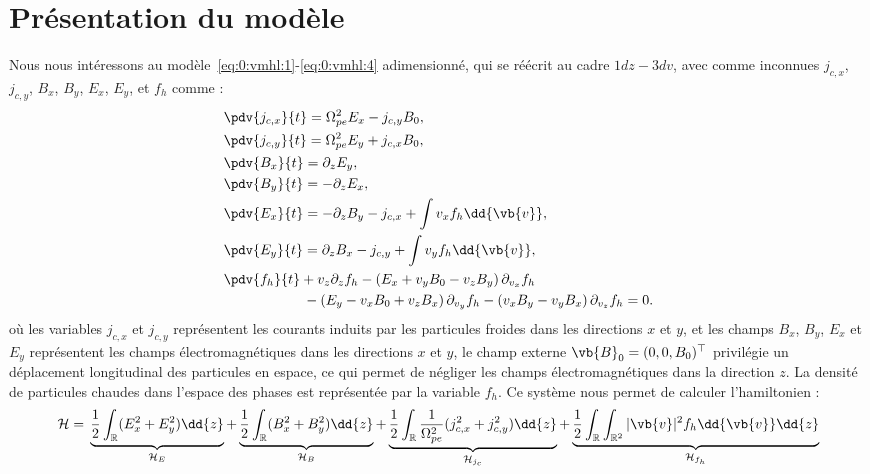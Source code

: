 
\section{Présentation du modèle}
\label{s:3:model}

Nous nous intéressons au modèle~\eqref{eq:0:vmhl:1}-\eqref{eq:0:vmhl:4} adimensionné, qui se réécrit au cadre $1dz-3dv$, avec comme inconnues $j_{c,x}$, $j_{c,y}$, $B_{x}$, $B_{y}$, $E_{x}$, $E_{y}$, et $f_h$ comme :
\begin{align}
  \label{eq:VHM:jx}
  &\pdv{j_{c,x}}{t} = \Omega_{pe}^2 { E}_x - { j}_{c,y}B_0,\\
  \label{eq:VHM:jy}
  &\pdv{j_{c,y}}{t} = \Omega_{pe}^2 { E}_y + { j}_{c,x}B_0,\\
  \label{eq:VHM:Bx}
  &\pdv{B_{x  }}{t} = \partial_z E_y,\\
  \label{eq:VHM:By}
  &\pdv{B_{y  }}{t} = -\partial_z E_x,\\
  \label{eq:VHM:Ex}
  &\pdv{E_{x  }}{t} =-\partial_z B_y - {j}_{c,x} + \int v_x f_h \dd{\vb{v}},\\
  \label{eq:VHM:Ey}
  &\pdv{E_{y  }}{t} =\partial_z B_x - {j}_{c,y} + \int v_y f_h \dd{\vb{v}}, \\
  \label{eq:VHM:fh}
  &\pdv{f_{h  }}{t} +  v_z\partial_z f_h - \left(E_x + v_y B_0 - v_zB_y\right)\partial_{v_x} f_h\\
  &\hspace{2cm}- \left(E_y - v_x B_0 + v_z B_x\right)\partial_{v_y} f_h- \left(v_x B_y- v_y B_x\right)\partial_{v_z} f_h = 0.\nonumber
\end{align}
où les variables $j_{c,x}$ et $j_{c,y}$ représentent les courants induits par les particules froides dans les directions $x$ et $y$, et les champs $B_x$, $B_y$, $E_x$ et $E_y$ représentent les champs électromagnétiques dans les directions $x$ et $y$, le champ externe $\vb{B}_0=(0,0,B_0)^\top$ privilégie un déplacement longitudinal des particules en espace, ce qui permet de négliger les champs électromagnétiques dans la direction $z$. La densité de particules chaudes dans l'espace des phases est représentée par la variable $f_h$. Ce système nous permet de calculer l'hamiltonien :
\begin{equation}
  \mathcal{H} = {}
      \underbrace{\frac{1}{2}\int_{\mathbb{R}}(E_x^2+E_y^2) \dd{z}}_{\mathcal{H}_E}
    + \underbrace{\frac{1}{2}\int_{\mathbb{R}}(B_x^2+B_y^2) \dd{z}}_{\mathcal{H}_B}
    + \underbrace{\frac{1}{2}\int_{\mathbb{R}}\frac{1}{\Omega_{pe}^2}(j_{c,x}^2+j_{c,y}^2) \dd{z}}_{\mathcal{H}_{j_c}}
    + \underbrace{\frac{1}{2}\int_{\mathbb{R}}\int_{\mathbb{R}^2}|\vb{v}|^2 f_h \dd{\vb{v}}\dd{z}}_{\mathcal{H}_{f_h}}
  \label{eq:ham1dz3dv}
\end{equation}

